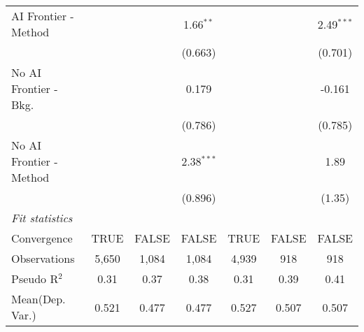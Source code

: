 \begin{tabular}{lcccccc}
   AI Frontier - Method    &               &              & 1.66$^{**}$  &              &              & 2.49$^{***}$\\   
                           &               &              & (0.663)      &              &              & (0.701)\\   
   No AI Frontier - Bkg.   &               &              & 0.179        &              &              & -0.161\\   
                           &               &              & (0.786)      &              &              & (0.785)\\   
   No AI Frontier - Method &               &              & 2.38$^{***}$ &              &              & 1.89\\   
                           &               &              & (0.896)      &              &              & (1.35)\\   
   \midrule
   \emph{Fit statistics}\\
   Convergence             &TRUE           & FALSE        & FALSE        & TRUE         & FALSE        & FALSE\\  
   Observations            & 5,650         & 1,084        & 1,084        & 4,939        & 918          & 918\\  
   Pseudo R$^2$            & 0.31          & 0.37         & 0.38         & 0.31         & 0.39         & 0.41\\  
Mean(Dep. Var.) & 0.521 & 0.477 & 0.477 & 0.527 & 0.507 & 0.507 \\
   

\end{tabular}
